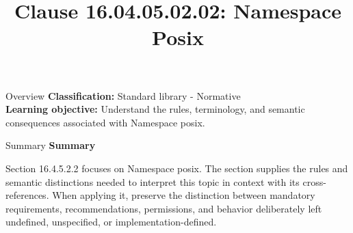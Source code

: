 \documentclass[10pt,letterpaper]{article}
\title{Clause 16.04.05.02.02: Namespace Posix}
\author{}
\date{}
\begin{document}
\maketitle
\begin{CornellOverviewBox}{Overview}
\textbf{Classification:} Standard library - Normative\\[2pt]
\textbf{Learning objective:} Understand the rules, terminology, and semantic consequences associated with Namespace posix.
\end{CornellOverviewBox}\begin{CornellSummaryBox}{Summary}
{\sffamily\bfseries\color{Accent} Summary}\par\vspace{3pt}Section 16.4.5.2.2 focuses on Namespace posix. The section supplies the rules and semantic distinctions needed to interpret this topic in context with its cross-references. When applying it, preserve the distinction between mandatory requirements, recommendations, permissions, and behavior deliberately left undefined, unspecified, or implementation-defined.
\end{CornellSummaryBox}
\end{document}
